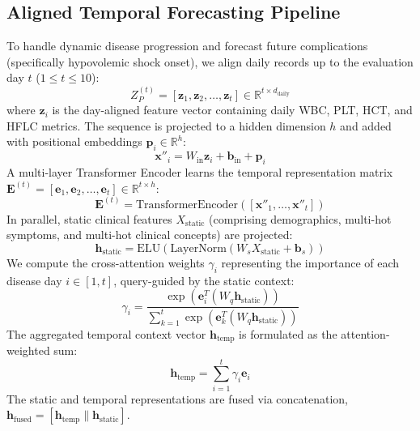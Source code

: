 \documentclass[conference]{IEEEtran}
\begin{document}
\subsection{Aligned Temporal Forecasting Pipeline}
To handle dynamic disease progression and forecast future complications (specifically hypovolemic shock onset), we align daily records up to the evaluation day $t$ ($1 \le t \le 10$):
\begin{equation}
    Z_P^{(t)} = [\mathbf{z}_1, \mathbf{z}_2, \dots, \mathbf{z}_t] \in \mathbb{R}^{t \times d_{\text{daily}}}
\end{equation}
where $\mathbf{z}_i$ is the day-aligned feature vector containing daily WBC, PLT, HCT, and HFLC metrics. The sequence is projected to a hidden dimension $h$ and added with positional embeddings $\mathbf{p}_i \in \mathbb{R}^h$:
\begin{equation}
    \mathbf{x}''_i = W_{\text{in}} \mathbf{z}_i + \mathbf{b}_{\text{in}} + \mathbf{p}_i
\end{equation}
A multi-layer Transformer Encoder learns the temporal representation matrix $\mathbf{E}^{(t)} = [\mathbf{e}_1, \mathbf{e}_2, \dots, \mathbf{e}_t] \in \mathbb{R}^{t \times h}$:
\begin{equation}
    \mathbf{E}^{(t)} = \text{TransformerEncoder}([\mathbf{x}''_1, \dots, \mathbf{x}''_t])
\end{equation}
In parallel, static clinical features $X_{\text{static}}$ (comprising demographics, multi-hot symptoms, and multi-hot clinical concepts) are projected:
\begin{equation}
    \mathbf{h}_{\text{static}} = \text{ELU}(\text{LayerNorm}(W_s X_{\text{static}} + \mathbf{b}_s))
\end{equation}
We compute the cross-attention weights $\gamma_i$ representing the importance of each disease day $i \in [1, t]$, query-guided by the static context:
\begin{equation}
    \gamma_i = \frac{\exp(\mathbf{e}_i^T (W_q \mathbf{h}_{\text{static}}))}{\sum_{k=1}^t \exp(\mathbf{e}_k^T (W_q \mathbf{h}_{\text{static}}))}
\end{equation}
The aggregated temporal context vector $\mathbf{h}_{\text{temp}}$ is formulated as the attention-weighted sum:
\begin{equation}
    \mathbf{h}_{\text{temp}} = \sum_{i=1}^t \gamma_i \mathbf{e}_i
\end{equation}
The static and temporal representations are fused via concatenation, $\mathbf{h}_{\text{fused}} = [\mathbf{h}_{\text{temp}} \| \mathbf{h}_{\text{static}}]$.
\end{document}
